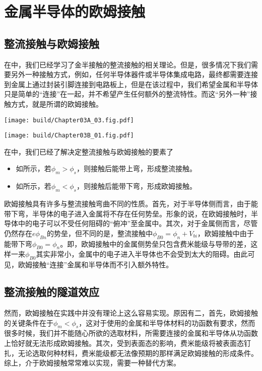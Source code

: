 \section{金属半导体的欧姆接触}

\subsection{整流接触与欧姆接触}

在中，我们已经学习了金半接触的整流接触的相关理论。但是，很多情况下我们需要另外一种接触方式，例如，任何半导体器件或半导体集成电路，最终都需要连接到金属上通过封装引脚连接到电路板上，但是在该过程中，我们希望金属和半导体只是简单的“连接”在一起，并不希望产生任何额外的整流特性。而这“另外一种”接触方式，就是所谓的欧姆接触。

\begin{Figure}[整流接触与欧姆接触]
    \begin{FigureSub}
        \texttt{[image: build/Chapter03A\_03.fig.pdf]}
    \end{FigureSub}
    \hspace{0.5cm}
    \begin{FigureSub}
        \texttt{[image: build/Chapter03B\_01.fig.pdf]}
    \end{FigureSub}
\end{Figure}

在中，我们已经了解决定整流接触与欧姆接触的要素了
\begin{itemize}
    \item 如所示，若$\phi_m>\phi_s$，则接触后能带上弯，形成整流接触。
    \item 如所示，若$\phi_m<\phi_s$，则接触后能带下弯，形成欧姆接触。
\end{itemize}

欧姆接触具有许多与整流接触弯曲不同的性质。首先，对于半导体侧而言，由于能带下弯，半导体的电子进入金属将不存在任何势垒。形象的说，在欧姆接触时，半导体中的电子可以不受任何阻碍的“俯冲”至金属中。其次，对于金属侧而言，尽管仍然存在$e\phi_{Bn}$的势垒，但不同的是，整流接触中$\phi_{B0}=\phi_n+V_{bi}$，欧姆接触中由于能带下弯$\phi_{B0}=\phi_n$。即，欧姆接触中的金属侧势垒只包含费米能级与导带的差，这样一来$\phi_{B0}$其实非常小，金属中的电子进入半导体也不会受到太大的阻碍。由此可见，欧姆接触“连接”金属和半导体而不引入额外特性。

\subsection{整流接触的隧道效应}
然而，欧姆接触在实践中并没有理论上这么容易实现。原因有二，首先，欧姆接触的关键条件在于$\phi_m<\phi_s$，这对于使用的金属和半导体材料的功函数有要求，然而很多时候，我们并不能随心所欲的选取材料，所需要连接的金属和半导体从功函数上恰好就无法形成欧姆接触。其次，受到表面态的影响，费米能级将被表面态钉扎，无论选取何种材料，费米能级都无法像预期的那样满足欧姆接触的形成条件。综上，介于欧姆接触常常难以实现，需要一种替代方案。

